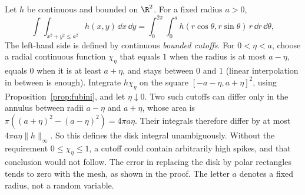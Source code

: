 \begin{proposition}\label{prop:polar}
Let $h$ be continuous and bounded on $\R^2$. For a fixed radius $a>0$,
\[
 \int\!\!\int_{x^2+y^2\le a^2} h(x,y)\,\dd x\,\dd y
 =\int_0^{2\pi}\int_0^a h(r\cos\theta,r\sin\theta)\,r\,\dd r\,\dd\theta,
\]
The left-hand side is defined by continuous \emph{bounded cutoffs}. For $0<\eta<a$, choose a radial continuous function $\chi_\eta$ that equals $1$ when the radius is at most $a-\eta$, equals $0$ when it is at least $a+\eta$, and stays between $0$ and $1$ (linear interpolation in between is enough). Integrate $h\chi_\eta$ on the square $[-a-\eta,a+\eta]^2$, using Proposition~\ref{prop:fubini}, and let $\eta\downarrow0$. Two such cutoffs can differ only in the annulus between radii $a-\eta$ and $a+\eta$, whose area is $\pi((a+\eta)^2-(a-\eta)^2)=4\pi a\eta$. Their integrals therefore differ by at most $4\pi a\eta\|h\|_\infty$. So this defines the disk integral unambiguously. Without the requirement $0\le\chi_\eta\le1$, a cutoff could contain arbitrarily high spikes, and that conclusion would not follow. The error in replacing the disk by polar rectangles tends to zero with the mesh, as shown in the proof. The letter $a$ denotes a fixed radius, not a random variable.
\end{proposition}
